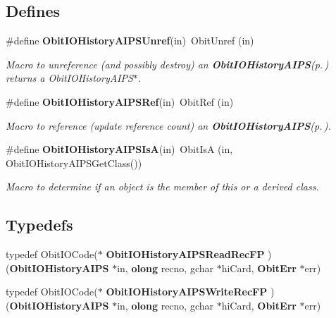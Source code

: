 \subsection*{Defines}
\begin{CompactItemize}
\item 
\#define {\bf Obit\-IOHistory\-AIPSUnref}(in)\ Obit\-Unref (in)
\begin{CompactList}\small\item\em Macro to unreference (and possibly destroy) an {\bf Obit\-IOHistory\-AIPS}{\rm (p.\,\pageref{structObitIOHistoryAIPS})} returns a Obit\-IOHistory\-AIPS$\ast$. \item\end{CompactList}\item 
\#define {\bf Obit\-IOHistory\-AIPSRef}(in)\ Obit\-Ref (in)
\begin{CompactList}\small\item\em Macro to reference (update reference count) an {\bf Obit\-IOHistory\-AIPS}{\rm (p.\,\pageref{structObitIOHistoryAIPS})}. \item\end{CompactList}\item 
\#define {\bf Obit\-IOHistory\-AIPSIs\-A}(in)\ Obit\-Is\-A (in, Obit\-IOHistory\-AIPSGet\-Class())
\begin{CompactList}\small\item\em Macro to determine if an object is the member of this or a derived class. \item\end{CompactList}\end{CompactItemize}
\subsection*{Typedefs}
\begin{CompactItemize}
\item 
typedef Obit\-IOCode($\ast$ {\bf Obit\-IOHistory\-AIPSRead\-Rec\-FP} )({\bf Obit\-IOHistory\-AIPS} $\ast$in, {\bf olong} recno, gchar $\ast$hi\-Card, {\bf Obit\-Err} $\ast$err)
\item 
typedef Obit\-IOCode($\ast$ {\bf Obit\-IOHistory\-AIPSWrite\-Rec\-FP} )({\bf Obit\-IOHistory\-AIPS} $\ast$in, {\bf olong} recno, gchar $\ast$hi\-Card, {\bf Obit\-Err} $\ast$err)
\end{CompactItemize}
